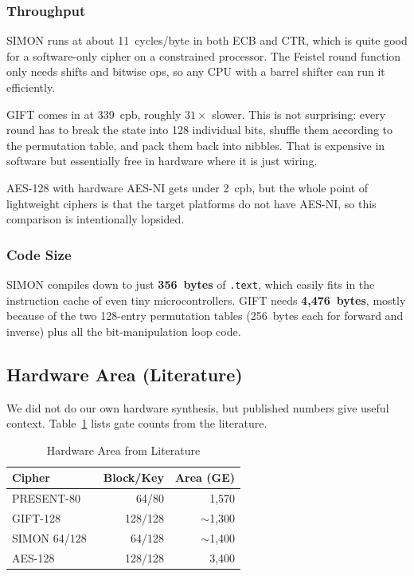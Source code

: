 \documentclass[conference]{IEEEtran}
\begin{document}
\subsubsection{Throughput}

SIMON runs at about 11~cycles/byte in both ECB and CTR, which is quite
good for a software-only cipher on a constrained processor.  The Feistel
round function only needs shifts and bitwise ops, so any CPU with a
barrel shifter can run it efficiently.

GIFT comes in at 339~cpb, roughly $31\times$ slower.  This is not
surprising: every round has to break the state into 128 individual bits,
shuffle them according to the permutation table, and pack them back
into nibbles.  That is expensive in software but essentially free in
hardware where it is just wiring.

AES-128 with hardware AES-NI gets under 2~cpb, but the whole point of
lightweight ciphers is that the target platforms do not have AES-NI, so
this comparison is intentionally lopsided.

\subsubsection{Code Size}

SIMON compiles down to just \textbf{356~bytes} of \texttt{.text}, which
easily fits in the instruction cache of even tiny microcontrollers.
GIFT needs \textbf{4,476~bytes}, mostly because of the two 128-entry
permutation tables (256~bytes each for forward and inverse) plus all
the bit-manipulation loop code.

\subsection{Hardware Area (Literature)}

We did not do our own hardware synthesis, but published numbers give
useful context.  Table~\ref{tab:hw} lists gate counts from the
literature.

\begin{table}[htbp]
\caption{Hardware Area from Literature}
\label{tab:hw}
\centering
\begin{tabular}{lrr}
\toprule
\textbf{Cipher} & \textbf{Block/Key} & \textbf{Area (GE)} \\
\midrule
PRESENT-80~\cite{bogdanov2007present} & 64/80  & 1{,}570 \\
GIFT-128~\cite{banik2017gift}         & 128/128 & $\sim$1{,}300 \\
SIMON 64/128~\cite{beaulieu2013simon} & 64/128  & $\sim$1{,}400 \\
AES-128~\cite{feldhofer2004strong}    & 128/128 & 3{,}400 \\
\bottomrule
\end{tabular}
\end{table}
\end{document}
